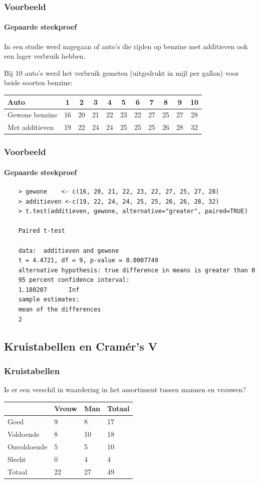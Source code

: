\begin{frame}
	\frametitle{Voorbeeld}
	\framesubtitle{Gepaarde steekproef}
	
	In een studie werd nagegaan of auto's die rijden op benzine met additieven ook een lager verbruik hebben.
	
	Bij 10 auto's werd het verbruik gemeten (uitgedrukt in mijl per gallon) voor beide soorten benzine:
	
	\vspace{.5cm}
	\centering
	\begin{tabular}{|l|c|c|c|c|c|c|c|c|c|c|}
		\hline
		Auto           & 1  & 2  & 3  & 4  & 5  & 6  & 7  & 8  & 9  & 10 \\ \hline
		Gewone benzine & 16 & 20 & 21 & 22 & 23 & 22 & 27 & 25 & 27 & 28 \\ \hline
		Met additieven & 19 & 22 & 24 & 24 & 25 & 25 & 25 & 26 & 28 & 32 \\ \hline
	\end{tabular} 
\end{frame}

\begin{frame}[fragile]
	\frametitle{Voorbeeld}
	\framesubtitle{Gepaarde steekproef}
	
	\footnotesize
	\begin{verbatim}
	> gewone    <- c(16, 20, 21, 22, 23, 22, 27, 25, 27, 28)
	> additieven <-c(19, 22, 24, 24, 25, 25, 26, 26, 28, 32)
	> t.test(additieven, gewone, alternative="greater", paired=TRUE)
	
	Paired t-test
	
	data:  additieven and gewone
	t = 4.4721, df = 9, p-value = 0.0007749
	alternative hypothesis: true difference in means is greater than 0
	95 percent confidence interval:
	1.180207      Inf
	sample estimates:
	mean of the differences 
	2
	\end{verbatim}
\end{frame}


\subsection{Kruistabellen en Cramér's V}


\begin{frame}
	\frametitle{Kruistabellen}
	Is er een verschil in waardering in het assortiment tussen mannen en vrouwen?
	
	\begin{table}[h]
		\begin{tabular}{l||l|l||l}
			& Vrouw & Man & Totaal \\ \hline \hline
			Goed        & 9     & 8   & 17     \\
			Voldoende   & 8     & 10  & 18     \\
			Onvoldoende & 5     & 5   & 10     \\
			Slecht      & 0     & 4   & 4      \\ \hline \hline
			Totaal      & 22    & 27  & 49     \\
		\end{tabular}
	\end{table}
\end{frame}


